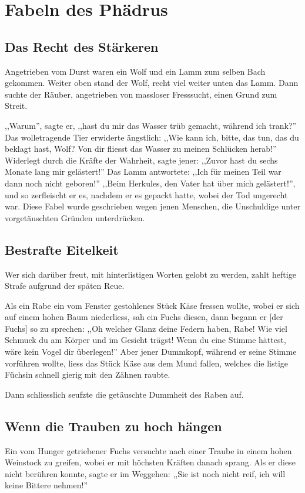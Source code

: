 \documentclass[a4paper]{article}
\begin{document}
\section{Fabeln des Phädrus}
\subsection{Das Recht des Stärkeren}
Angetrieben vom Durst waren ein Wolf und ein Lamm zum selben Bach gekommen. Weiter oben stand der Wolf, recht viel weiter unten das Lamm. Dann suchte der Räuber, angetrieben von massloser Fresssucht, einen Grund zum Streit.

,,Warum'', sagte er, ,,hast du mir das Wasser trüb gemacht, während ich trank?''
Das wolletragende Tier erwiderte ängstlich: ,,Wie kann ich, bitte, das tun, das du beklagt hast, Wolf? Von dir fliesst das Wasser zu meinen Schlücken herab!''
Widerlegt durch die Kräfte der Wahrheit, sagte jener: ,,Zuvor hast du sechs Monate lang mir gelästert!'' Das Lamm antwortete: ,,Ich für meinen Teil war dann noch nicht geboren!'' ,,Beim Herkules, den Vater hat über mich gelästert!'', und so zerfleischt er es, nachdem er es gepackt hatte, wobei der Tod ungerecht war.
Diese Fabel wurde geschrieben wegen jenen Menschen, die Unschuldige unter vorgetäuschten Gründen unterdrücken.

\subsection{Bestrafte Eitelkeit}
Wer sich darüber freut, mit hinterlistigen Worten gelobt zu werden, zahlt heftige Strafe aufgrund der späten Reue.

Als ein Rabe ein vom Fenster gestohlenes Stück Käse fressen wollte, wobei er sich auf einem hohen Baum niederliess, sah ein Fuchs diesen, dann begann er [der Fuchs] so zu sprechen:
,,Oh welcher Glanz deine Federn haben, Rabe! Wie viel Schmuck du am Körper und im Gesicht trägst! Wenn du eine Stimme hättest, wäre kein Vogel dir überlegen!''
Aber jener Dummkopf, während er seine Stimme vorführen wollte, liess das Stück Käse aus dem Mund fallen, welches die listige Füchsin schnell gierig mit den Zähnen raubte.

Dann schliesslich seufzte die getäuschte Dummheit des Raben auf.

\subsection{Wenn die Trauben zu hoch hängen}
Ein vom Hunger getriebener Fuchs versuchte nach einer Traube in einem hohen Weinstock zu greifen, wobei er mit höchsten Kräften danach sprang. Als er diese nicht berühren konnte, sagte er im Weggehen: ,,Sie ist noch nicht reif, ich will keine Bittere nehmen!''
\end{document}
